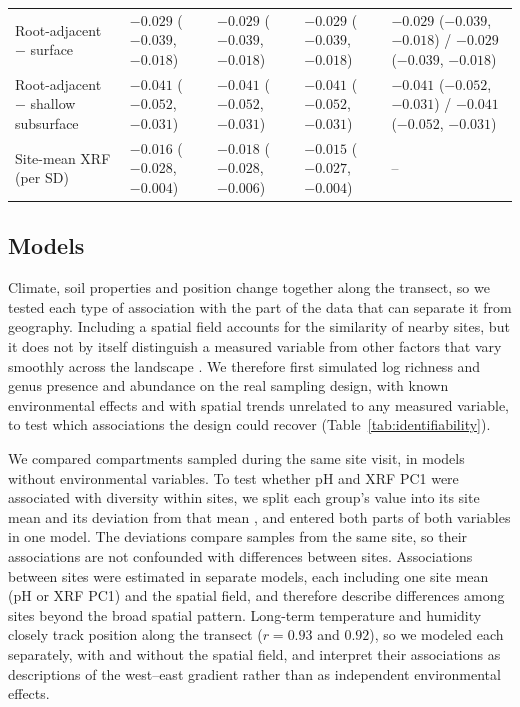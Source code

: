 \documentclass[11pt]{article}
\begin{document}
\begin{table}
{\begin{tabular}{lllll}
Root-adjacent $-$ surface      & $-0.029$ ($-0.039$, $-0.018$) & $-0.029$ ($-0.039$, $-0.018$) & $-0.029$ ($-0.039$, $-0.018$) & $-0.029$ ($-0.039$, $-0.018$) / $-0.029$ ($-0.039$, $-0.018$) \\
Root-adjacent $-$ shallow subsurface & $-0.041$ ($-0.052$, $-0.031$) & $-0.041$ ($-0.052$, $-0.031$) & $-0.041$ ($-0.052$, $-0.031$) & $-0.041$ ($-0.052$, $-0.031$) / $-0.041$ ($-0.052$, $-0.031$) \\
Site-mean XRF (per SD)         & $-0.016$ ($-0.028$, $-0.004$) & $-0.018$ ($-0.028$, $-0.006$) & $-0.015$ ($-0.027$, $-0.004$) & -- \\
\bottomrule
\end{tabular}
}
\end{table}


\subsection{Models}\label{models}
Climate, soil properties and position change together along the transect, so we tested each type of association with the part of the data that can separate it from geography. Including a spatial field accounts for the similarity of nearby sites, but it does not by itself distinguish a measured variable from other factors that vary smoothly across the landscape \cite{hodges2010}. We therefore first simulated log richness and genus presence and abundance on the real sampling design, with known environmental effects and with spatial trends unrelated to any measured variable, to test which associations the design could recover (Table~\ref{tab:identifiability}).

We compared compartments sampled during the same site visit, in models without environmental variables. To test whether pH and XRF PC1 were associated with diversity within sites, we split each group's value into its site mean and its deviation from that mean \cite{mundlak1978}, and entered both parts of both variables in one model. The deviations compare samples from the same site, so their associations are not confounded with differences between sites. Associations between sites were estimated in separate models, each including one site mean (pH or XRF PC1) and the spatial field, and therefore describe differences among sites beyond the broad spatial pattern. Long-term temperature and humidity closely track position along the transect ($r = 0.93$ and $0.92$), so we modeled each separately, with and without the spatial field, and interpret their associations as descriptions of the west--east gradient rather than as independent environmental effects.
\end{document}
